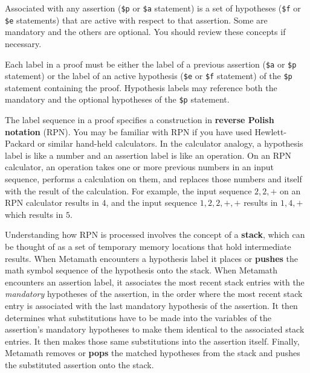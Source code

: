 Associated with any assertion (\texttt{\$p} or
\texttt{\$a} statement) is a set of
hypotheses (\texttt{\$f} or
\texttt{\$e} statements) that are active
with respect to that assertion.  Some are mandatory and the others are
optional.  You should review these concepts if necessary.

Each label in a proof must be either the label of a
previous assertion (\texttt{\$a} or
\texttt{\$p} statement) or the label of an
active hypothesis (\texttt{\$e} or \texttt{\$f} statement) of the \texttt{\$p} statement containing the
proof.  Hypothesis labels may reference both the
mandatory and the optional hypotheses of the
\texttt{\$p} statement.

The label sequence in a proof specifies a construction in {\bf reverse Polish
notation} (RPN).  You may be familiar
with RPN if you have used Hewlett-Packard or similar hand-held calculators.
In the calculator analogy, a hypothesis label is like
a number and an assertion label is like an operation.
On an RPN calculator, an operation takes one or more previous numbers in an
input sequence, performs a calculation on them, and replaces those numbers and
itself with the result of the calculation.  For example, the input sequence
$2,2,+$ on an RPN calculator results in $4$, and the input sequence
$1,2,2,+,+$ results in $1,4,+$ which results in $5$.

Understanding how RPN is processed involves the concept of a {\bf
stack}, which can be thought of as a set of
temporary memory locations that hold intermediate results.  When Metamath
encounters a hypothesis label it places or {\bf pushes} the math
symbol sequence of the hypothesis onto the stack.  When Metamath encounters an
assertion label, it associates the most recent stack entries with the {\em
mandatory} hypotheses of the assertion, in the
order where the most recent stack entry is associated with the last mandatory
hypothesis of the assertion.  It then determines what
substitutions have
to be made into the variables of the assertion's mandatory hypotheses to make
them identical to the associated stack entries.  It then makes those same
substitutions into the assertion itself.  Finally, Metamath removes or {\bf
pops} the matched hypotheses from the stack and pushes the
substituted assertion onto the stack.

